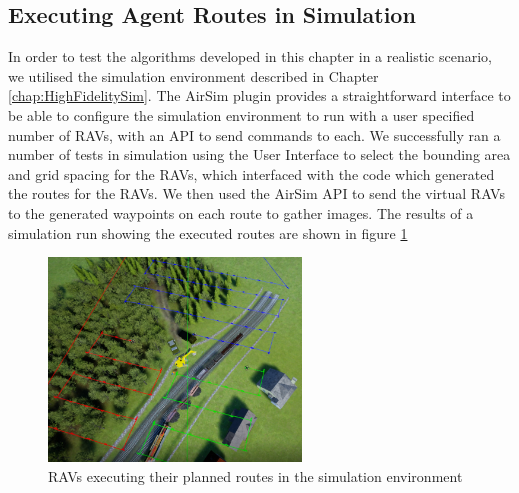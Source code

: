 \subsection{Executing Agent Routes in Simulation}\label{subsec:routesInSimulation}
In order to test the algorithms developed in this chapter in a realistic scenario, we utilised the simulation environment described in Chapter \ref{chap:HighFidelitySim}. The AirSim plugin \cite{Shah2017AirSim:Vehicles} provides a straightforward interface to be able to configure the simulation environment to run with a user specified number of RAVs, with an API to send commands to each. We successfully ran a number of tests in simulation using the User Interface to select the bounding area and grid spacing for the RAVs, which interfaced with the code which generated the routes for the RAVs. We then used the AirSim API to send the virtual RAVs to the generated waypoints on each route to gather images. The results of a simulation run showing the executed routes are shown in figure \ref{fig:VirtualPlannedRoutes}


\begin{figure}
    \centering
    \includegraphics[width=0.6\textwidth]{Chapters/SimulationEnv/Figs/DebuggingLines/RoutesWithRAVsVisible.png}
    \caption{RAVs executing their planned routes in the simulation environment}
    \label{fig:VirtualPlannedRoutes}
\end{figure}